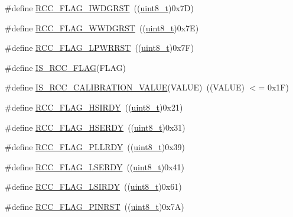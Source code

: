 \begin{DoxyCompactItemize}
\item 
\#define \hyperlink{group___r_c_c___flag_gaac46bac8a97cf16635ff7ffc1e6c657f}{R\+C\+C\+\_\+\+F\+L\+A\+G\+\_\+\+I\+W\+D\+G\+R\+ST}~((\hyperlink{_p_e___types_8h_aba7bc1797add20fe3efdf37ced1182c5}{uint8\+\_\+t})0x7\+D)
\item 
\#define \hyperlink{group___r_c_c___flag_gaa80b60b2d497ccd7b7de1075009999a7}{R\+C\+C\+\_\+\+F\+L\+A\+G\+\_\+\+W\+W\+D\+G\+R\+ST}~((\hyperlink{_p_e___types_8h_aba7bc1797add20fe3efdf37ced1182c5}{uint8\+\_\+t})0x7\+E)
\item 
\#define \hyperlink{group___r_c_c___flag_ga67049531354aed7546971163d02c9920}{R\+C\+C\+\_\+\+F\+L\+A\+G\+\_\+\+L\+P\+W\+R\+R\+ST}~((\hyperlink{_p_e___types_8h_aba7bc1797add20fe3efdf37ced1182c5}{uint8\+\_\+t})0x7\+F)
\item 
\#define \hyperlink{group___r_c_c___flag_gaa27dea5bb62b26d0881e649770252158}{I\+S\+\_\+\+R\+C\+C\+\_\+\+F\+L\+AG}(F\+L\+AG)
\item 
\#define \hyperlink{group___r_c_c___flag_gafda50a08dc048f7c272bf04ec9c2c2b7}{I\+S\+\_\+\+R\+C\+C\+\_\+\+C\+A\+L\+I\+B\+R\+A\+T\+I\+O\+N\+\_\+\+V\+A\+L\+UE}(V\+A\+L\+UE)~((V\+A\+L\+UE) $<$= 0x1\+F)
\item 
\#define \hyperlink{group___r_c_c___flag_ga827d986723e7ce652fa733bb8184d216}{R\+C\+C\+\_\+\+F\+L\+A\+G\+\_\+\+H\+S\+I\+R\+DY}~((\hyperlink{_p_e___types_8h_aba7bc1797add20fe3efdf37ced1182c5}{uint8\+\_\+t})0x21)
\item 
\#define \hyperlink{group___r_c_c___flag_ga173edf47bec93cf269a0e8d0fec9997c}{R\+C\+C\+\_\+\+F\+L\+A\+G\+\_\+\+H\+S\+E\+R\+DY}~((\hyperlink{_p_e___types_8h_aba7bc1797add20fe3efdf37ced1182c5}{uint8\+\_\+t})0x31)
\item 
\#define \hyperlink{group___r_c_c___flag_gaf82d8afb18d9df75db1d6c08b9c50046}{R\+C\+C\+\_\+\+F\+L\+A\+G\+\_\+\+P\+L\+L\+R\+DY}~((\hyperlink{_p_e___types_8h_aba7bc1797add20fe3efdf37ced1182c5}{uint8\+\_\+t})0x39)
\item 
\#define \hyperlink{group___r_c_c___flag_gac9fb963db446c16e46a18908f7fe1927}{R\+C\+C\+\_\+\+F\+L\+A\+G\+\_\+\+L\+S\+E\+R\+DY}~((\hyperlink{_p_e___types_8h_aba7bc1797add20fe3efdf37ced1182c5}{uint8\+\_\+t})0x41)
\item 
\#define \hyperlink{group___r_c_c___flag_ga8c5e4992314d347597621bfe7ab10d72}{R\+C\+C\+\_\+\+F\+L\+A\+G\+\_\+\+L\+S\+I\+R\+DY}~((\hyperlink{_p_e___types_8h_aba7bc1797add20fe3efdf37ced1182c5}{uint8\+\_\+t})0x61)
\item 
\#define \hyperlink{group___r_c_c___flag_gabfc3ab5d4a8a94ec1c9f38794ce37ad6}{R\+C\+C\+\_\+\+F\+L\+A\+G\+\_\+\+P\+I\+N\+R\+ST}~((\hyperlink{_p_e___types_8h_aba7bc1797add20fe3efdf37ced1182c5}{uint8\+\_\+t})0x7\+A)

\end{DoxyCompactItemize}
